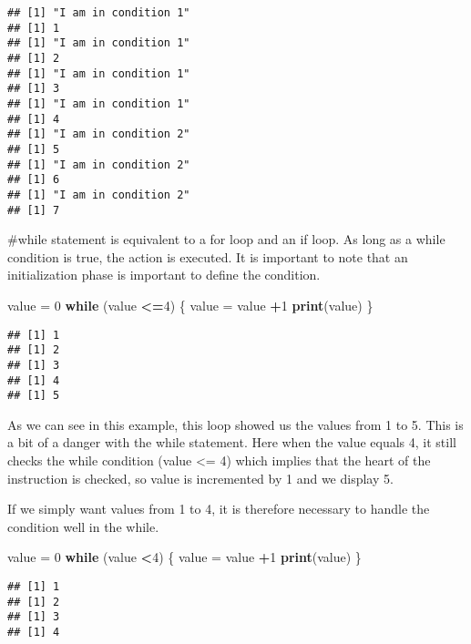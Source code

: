 \documentclass[
]{article}
\newenvironment{Shaded}{\begin{snugshade}}{\end{snugshade}}
\newcommand{\ControlFlowTok}[1]{\textcolor[rgb]{0.13,0.29,0.53}{\textbf{#1}}}
\newcommand{\DecValTok}[1]{\textcolor[rgb]{0.00,0.00,0.81}{#1}}
\newcommand{\FunctionTok}[1]{\textcolor[rgb]{0.13,0.29,0.53}{\textbf{#1}}}
\newcommand{\NormalTok}[1]{#1}
\newcommand{\OtherTok}[1]{\textcolor[rgb]{0.56,0.35,0.01}{#1}}
\newcommand{\SpecialCharTok}[1]{\textcolor[rgb]{0.81,0.36,0.00}{\textbf{#1}}}
\begin{document}
\begin{verbatim}
## [1] "I am in condition 1"
## [1] 1
## [1] "I am in condition 1"
## [1] 2
## [1] "I am in condition 1"
## [1] 3
## [1] "I am in condition 1"
## [1] 4
## [1] "I am in condition 2"
## [1] 5
## [1] "I am in condition 2"
## [1] 6
## [1] "I am in condition 2"
## [1] 7
\end{verbatim}

\#while statement is equivalent to a for loop and an if loop. As long as
a while condition is true, the action is executed. It is important to
note that an initialization phase is important to define the condition.

\begin{Shaded}
\begin{Highlighting}[]
\NormalTok{value }\OtherTok{=} \DecValTok{0}
\ControlFlowTok{while}\NormalTok{ (value }\SpecialCharTok{\textless{}=}\DecValTok{4}\NormalTok{) \{}
\NormalTok{value }\OtherTok{=}\NormalTok{ value }\SpecialCharTok{+}\DecValTok{1}
\FunctionTok{print}\NormalTok{(value)}
\NormalTok{\}}
\end{Highlighting}
\end{Shaded}

\begin{verbatim}
## [1] 1
## [1] 2
## [1] 3
## [1] 4
## [1] 5
\end{verbatim}

As we can see in this example, this loop showed us the values from 1 to
5. This is a bit of a danger with the while statement. Here when the
value equals 4, it still checks the while condition (value \textless= 4)
which implies that the heart of the instruction is checked, so value is
incremented by 1 and we display 5.

If we simply want values from 1 to 4, it is therefore necessary to
handle the condition well in the while.

\begin{Shaded}
\begin{Highlighting}[]
\NormalTok{value }\OtherTok{=} \DecValTok{0}
\ControlFlowTok{while}\NormalTok{ (value }\SpecialCharTok{\textless{}}\DecValTok{4}\NormalTok{) \{}
\NormalTok{value }\OtherTok{=}\NormalTok{ value }\SpecialCharTok{+}\DecValTok{1}
\FunctionTok{print}\NormalTok{(value)}
\NormalTok{\}}
\end{Highlighting}
\end{Shaded}

\begin{verbatim}
## [1] 1
## [1] 2
## [1] 3
## [1] 4
\end{verbatim}
\end{document}

